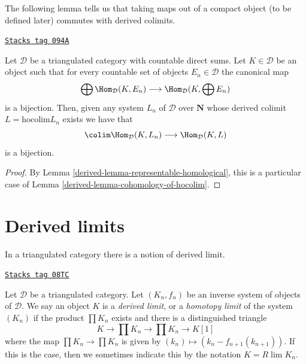 The following lemma tells us that taking maps out of a compact
object (to be defined later) commutes with derived colimits.

\begin{lemma}
\label{derived-lemma-commutes-with-countable-sums}
\href{https://stacks.math.columbia.edu/tag/094A}{\texttt{Stacks tag 094A}}

Let $\mathcal{D}$ be a triangulated category with countable direct sums.
Let $K \in \mathcal{D}$ be an object such that for every
countable set of objects $E_n \in \mathcal{D}$ the canonical map
$$
\bigoplus \Hom_\mathcal{D}(K, E_n)
\longrightarrow
\Hom_\mathcal{D}(K, \bigoplus E_n)
$$
is a bijection. Then, given any system $L_n$ of $\mathcal{D}$ over
$\mathbf{N}$ whose derived colimit $L = \text{hocolim} L_n$
exists we have that
$$
\colim \Hom_\mathcal{D}(K, L_n) \longrightarrow \Hom_\mathcal{D}(K, L)
$$
is a bijection.
\end{lemma}

\begin{proof}

By Lemma \ref{derived-lemma-representable-homological}, this is a particular case
of Lemma \ref{derived-lemma-cohomology-of-hocolim}.
\end{proof}

\section{Derived limits}
\label{derived-section-derived-limit}
In a triangulated category there is a notion of derived limit.

\begin{definition}
\label{derived-definition-derived-limit}
\href{https://stacks.math.columbia.edu/tag/08TC}{\texttt{Stacks tag 08TC}}

Let $\mathcal{D}$ be a triangulated category.
Let $(K_n, f_n)$ be an inverse system of objects of $\mathcal{D}$.
We say an object $K$ is a {\it derived limit}, or a
{\it homotopy limit} of the system $(K_n)$ if
the product $\prod K_n$ exists and there is a distinguished triangle
$$
K \to \prod K_n \to \prod K_n \to K[1]
$$
where the map $\prod K_n \to \prod K_n$ is given
by $(k_n) \mapsto (k_n - f_{n + 1}(k_{n + 1}))$. If this is the
case, then we sometimes indicate this by the notation $K = R\lim K_n$.
\end{definition}


